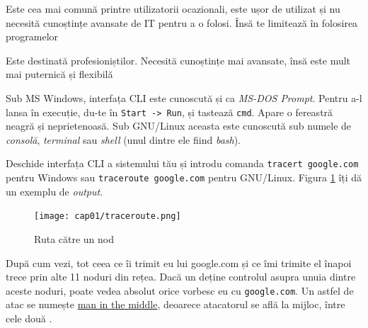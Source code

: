 \begin{itemize}
	\begin{item} 
	\end{item}
	
	\begin{item}
	\end{item}
\end{itemize}
Sub MS Windows, interfața CLI este cunoscută și ca \textsl{MS-DOS Prompt}. Pentru
a-l lansa în execuție, du-te în \texttt{Start -> Run}, și tastează \texttt{cmd}.
Apare o fereastră neagră și neprietenoasă. Sub GNU/Linux aceasta este
cunoscută sub numele de \textsl{consolă}, \textsl{terminal} sau
\textsl{shell} (unul dintre ele fiind \textsl{bash}).

Deschide interfața CLI a sistemului tău și introdu comanda
\texttt{tracert google.com} pentru Windows sau \texttt{traceroute google.com} pentru 
GNU/Linux. Figura \ref{fig:cli traceroute} îți dă un exemplu de \textsl{output}.

\begin{figure}[ht!]
  \centering
    \texttt{[image: cap01/traceroute.png]}
  \caption{Ruta către un nod}
  \label{fig:cli traceroute}
\end{figure}

După cum vezi, tot ceea ce îi trimit eu lui google.com și ce îmi trimite
el înapoi trece prin alte 11 noduri din rețea. Dacă un 
deține controlul asupra unuia dintre aceste noduri,
poate vedea absolut orice {\glqq}vorbesc{\grqq} eu cu \texttt{google.com}. Un astfel de atac
se numește \href{http://en.wikipedia.org/wiki/Man-in-the-middle_attack}{man in the middle},
deoarece atacatorul se află la mijloc, între
cele două .

